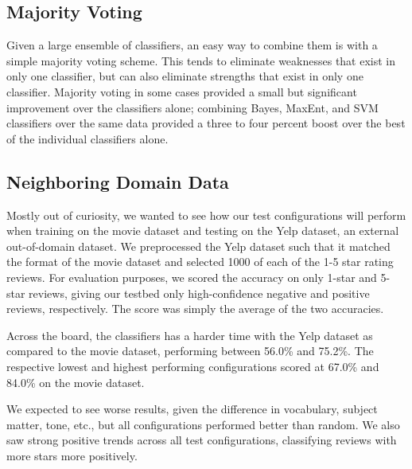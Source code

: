\documentclass[10pt,twocolumn,letterpaper]{article}
\begin{document}
\subsection{Majority Voting}
Given a large ensemble of classifiers, an easy way to combine them is with a simple majority voting scheme. This tends to eliminate weaknesses that exist in only one classifier, but can also eliminate strengths that exist in only one classifier.
Majority voting in some cases provided a small but significant improvement over the classifiers alone; combining Bayes, MaxEnt, and SVM classifiers over the same data provided a three to four percent boost over the best of the individual classifiers alone.

\subsection{Neighboring Domain Data}
Mostly out of curiosity, we wanted to see how our test configurations will perform when training on the movie dataset and testing on the Yelp dataset, an external out-of-domain dataset. We preprocessed the Yelp dataset such that it matched the format of the movie dataset and selected 1000 of each of the 1-5 star rating reviews. For evaluation purposes, we scored the accuracy on only 1-star and 5-star reviews, giving our testbed only high-confidence negative and positive reviews, respectively. The score was simply the average of the two accuracies.

Across the board, the classifiers has a harder time with the Yelp dataset as compared to the movie dataset, performing between 56.0\% and 75.2\%. The respective lowest and highest performing configurations scored at 67.0\% and 84.0\% on the movie dataset.

We expected to see worse results, given the difference in vocabulary, subject matter, tone, etc., but all configurations performed better than random. We also saw strong positive trends across all test configurations, classifying reviews with more stars more positively.


{\small


}
\end{document}
